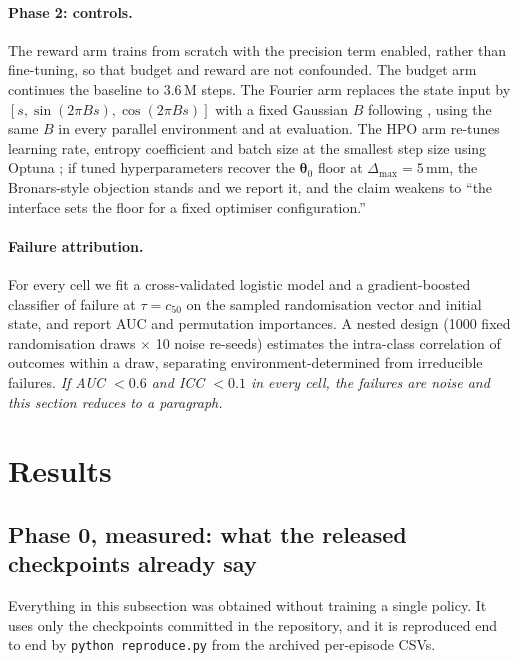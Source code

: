 \documentclass{article}
\newcommand{\planned}[1]{{\color{blue!70!black}\textit{#1}}}
\newcommand{\dmax}{\Delta_{\max}}
\newcommand{\iface}{\boldsymbol{\theta}}
\begin{document}
\paragraph{Phase 2: controls.}
The reward arm trains from scratch with the precision term enabled, rather than
fine-tuning, so that budget and reward are not confounded. The budget arm
continues the baseline to $3.6$\,M steps. The Fourier arm replaces the state
input by $[s, \sin(2\pi B s), \cos(2\pi B s)]$ with a fixed Gaussian $B$
following \citet{gyenes2026fourier}, using the same $B$ in every parallel
environment and at evaluation. The HPO arm re-tunes learning rate, entropy
coefficient and batch size at the smallest step size using Optuna
\citep{akiba2019optuna}; if tuned hyperparameters recover the $\iface_0$ floor at
$\dmax{=}5$\,mm, the Bronars-style objection stands and we report it, and the
claim weakens to ``the interface sets the floor for a fixed optimiser
configuration.''

\paragraph{Failure attribution.}
\label{sec:attrib}
For every cell we fit a cross-validated logistic model and a gradient-boosted
classifier of failure at $\tau{=}c_{50}$ on the sampled randomisation vector and
initial state, and report AUC and permutation importances. A nested design (1000
fixed randomisation draws $\times$ 10 noise re-seeds) estimates the intra-class
correlation of outcomes within a draw, separating environment-determined from
irreducible failures. \planned{If AUC $<0.6$ and ICC $<0.1$ in every cell, the
failures are noise and this section reduces to a paragraph.}

\section{Results}
\label{sec:results}

\subsection{Phase 0, measured: what the released checkpoints already say}
\label{sec:phase0}

Everything in this subsection was obtained without training a single policy. It
uses only the checkpoints committed in the repository, and it is reproduced end
to end by \texttt{python reproduce.py} from the archived per-episode CSVs.
\end{document}
